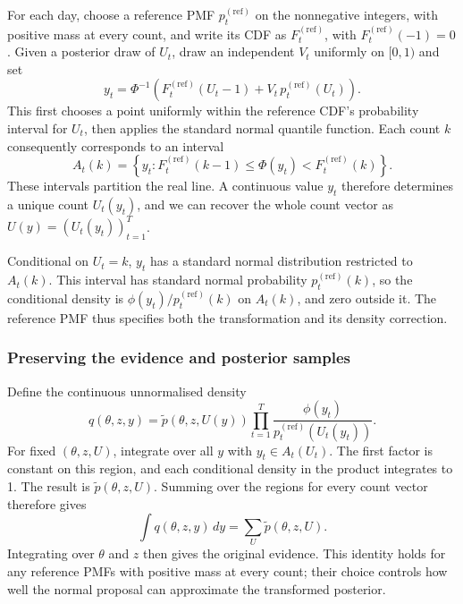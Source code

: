 \documentclass{article}
\begin{document}
For each day, choose a reference PMF \(p_t^{(\mathrm{ref})}\) on the
nonnegative integers, with positive mass at every count, and write its CDF
as \(F_t^{(\mathrm{ref})}\), with \(F_t^{(\mathrm{ref})}(-1)=0\). Given a
posterior draw of \(U_t\), draw an independent \(V_t\) uniformly on
\([0,1)\) and set
\begin{equation}
  y_t=\Phi^{-1}\left(F_t^{(\mathrm{ref})}(U_t-1)
  +V_t\,p_t^{(\mathrm{ref})}(U_t)\right).
  \label{eq:count-dequantisation}
\end{equation}
This first chooses a point uniformly within the reference CDF's probability
interval for \(U_t\), then applies the standard normal quantile function.
Each count \(k\) consequently corresponds to an interval
\begin{equation}
  A_t(k)=\left\{y_t:
  F_t^{(\mathrm{ref})}(k-1)\leq\Phi(y_t)<F_t^{(\mathrm{ref})}(k)\right\}.
\end{equation}
These intervals partition the real line. A continuous value \(y_t\)
therefore determines a unique count \(U_t(y_t)\), and we can recover the
whole count vector as \(U(y)=(U_t(y_t))_{t=1}^{T}\).

Conditional on \(U_t=k\), \(y_t\) has a standard normal distribution
restricted to \(A_t(k)\). This interval has standard normal probability
\(p_t^{(\mathrm{ref})}(k)\), so the conditional density is
\(\phi(y_t)/p_t^{(\mathrm{ref})}(k)\) on \(A_t(k)\), and zero outside it.
The reference PMF thus specifies both the transformation and its density
correction.

\subsubsection{Preserving the evidence and posterior samples}

Define the continuous unnormalised density
\begin{equation}
  q(\theta,z,y)=\tilde p\left(\theta,z,U(y)\right)
  \prod_{t=1}^{T}\frac{\phi(y_t)}{p_t^{(\mathrm{ref})}\left(U_t(y_t)\right)}.
\end{equation}
For fixed \((\theta,z,U)\), integrate over all \(y\) with
\(y_t\in A_t(U_t)\). The first factor is constant on this region, and
each conditional density in the product integrates to 1. The result is
\(\tilde p(\theta,z,U)\). Summing over the regions for every count vector
therefore gives
\begin{equation}
  \int q(\theta,z,y)\,dy=\sum_U\tilde p(\theta,z,U).
\end{equation}
Integrating over \(\theta\) and \(z\) then gives the original evidence.
This identity holds for any reference PMFs with positive mass at every
count; their choice controls how well the normal proposal can approximate
the transformed posterior.
\end{document}
